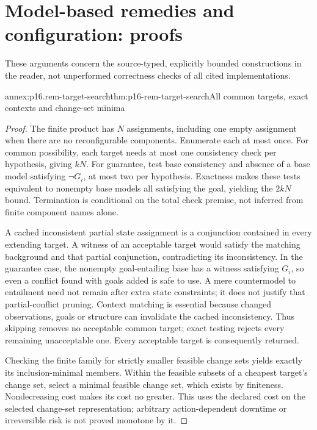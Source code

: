 \section{Model-based remedies and configuration: proofs}
\label{sec:annex-p16-model-based-remedy-and-configuration}

These arguments concern the source-typed, explicitly bounded constructions
in the reader, not unperformed correctness checks of all cited implementations.

\begin{annexitem}{annex:p16.rem-target-search}{thm:p16-rem-target-search}{All common targets, exact contexts and change-set minima}
\begin{proof}
The finite product has \(N\) assignments, including one empty assignment
when there are no reconfigurable components. Enumerate each at most once.
For common possibility, each target needs at most one consistency check
per hypothesis, giving \(kN\). For guarantee, test base consistency and
absence of a base model satisfying \(\neg G_i\), at most two per hypothesis.
Exactness makes these tests equivalent to nonempty base models all satisfying
the goal, yielding the \(2kN\) bound. Termination is conditional on the
total check premise, not inferred from finite component names alone.

A cached inconsistent partial state assignment is a conjunction contained
in every extending target. A witness of an acceptable target would satisfy
the matching background and that partial conjunction, contradicting its
inconsistency. In the guarantee case, the nonempty goal-entailing base has
a witness satisfying \(G_i\), so even a conflict found with goals added
is safe to use. A mere countermodel to entailment need not remain after
extra state constraints; it does not justify that partial-conflict pruning.
Context matching is essential because changed observations, goals or
structure can invalidate the cached inconsistency. Thus skipping removes
no acceptable common target; exact testing rejects every remaining
unacceptable one. Every acceptable target is consequently returned.

Checking the finite family for strictly smaller feasible change sets yields
exactly its inclusion-minimal members. Within the feasible subsets of a
cheapest target's change set, select a minimal feasible change set, which
exists by finiteness. Nondecreasing cost makes its cost no greater. This
uses the declared cost on the selected change-set representation; arbitrary
action-dependent downtime or irreversible risk is not proved monotone by it.
\end{proof}
\end{annexitem}

